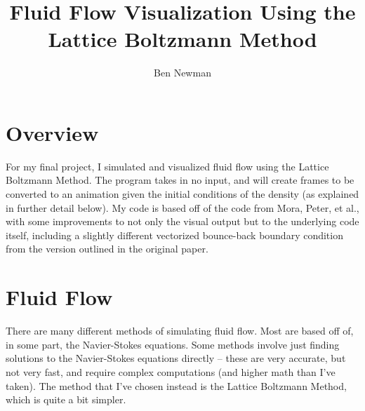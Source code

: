 \documentclass[12pt]{article}
\title{Fluid Flow Visualization Using the Lattice Boltzmann Method}
\author{Ben Newman}
\begin{document}
	\maketitle
	\thispagestyle{empty}
	\newpage
	
	\section{Overview}
	For my  final project, I simulated and visualized fluid flow using the Lattice Boltzmann Method. The program takes  in no input, and will create frames to be converted to an animation given the initial conditions of the density (as explained in further detail below). My code is based off of the code from Mora, Peter, et al., with some improvements to not only the visual output but to the underlying code itself, including a slightly different vectorized bounce-back boundary condition from the version outlined in the original paper.
	\section{Fluid Flow}
	There are many different methods of simulating fluid flow. Most are based off of, in some part, the Navier-Stokes equations. Some methods involve just finding solutions to the Navier-Stokes equations directly -- these are very accurate, but not very fast, and require complex computations (and higher math than I've taken). The method that I've chosen instead is the Lattice Boltzmann Method, which is quite a bit simpler.
\end{document}
